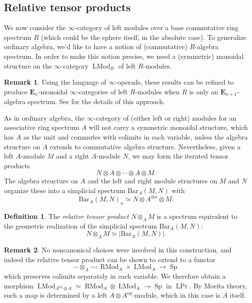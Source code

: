 \documentclass{article}
\theoremstyle{definition}
\newtheorem{definition}{Definition}[subsection]
\newtheorem{remark}{Remark}[subsection]
\newcommand{\EE}{\mathbf{E}}
\newcommand{\too}{\longrightarrow}
\newcommand{\op}{\mathrm{op}}
\DeclareMathOperator{\LMod}{LMod}
\DeclareMathOperator{\RMod}{RMod}
\DeclareMathOperator{\Prl}{LPr}
\DeclareMathOperator{\Sp}{Sp}
\begin{document}
\subsection{Relative tensor products}\label{sec:rtp}


We now consider the $\infty$-category of left modules over a base commutative ring spectrum $R$ (which could be the sphere itself, in the absolute case).
To generalize ordinary algebra, we'd like to have a notion of (commutative) $R$-algebra spectrum.
In order to make this notion precise, we need a (symmetric) monoidal structure on the $\infty$-category $\LMod_R$ of left $R$-modules.
\begin{remark}
Using the language of $\infty$-operads, these results can be refined to produce $\EE_n$-monoidal $\infty$-categories of left $R$-modules when $R$ is only an $\EE_{n+1}$-algebra spectrum.
See \cite{HA} for the details of this approach.
\end{remark}

As in ordinary algebra, the $\infty$-category of (either left or right) modules for an associative ring spectrum $A$ will not carry a symmetric monoidal structure, which has $A$ as the unit and commutes with colimits in each variable, unless the algebra structure on $A$ extends to commutative algebra structure.
Nevertheless, given a left $A$-module $M$ and a right $A$-module $N$, we may form the iterated tensor products
\[
N\otimes A\otimes\cdots\otimes A\otimes M.
\]
The algebra structure on $A$ and the left and right module structures on $M$ and $N$ organize these into a simplicial spectrum $\mathrm{Bar}_A(M,N)$ with
\[
\mathrm{Bar}_A(M,N)_n\simeq N\otimes A^{\otimes n}\otimes M.
\]
\begin{definition}
The {\em relative tensor product} $N\otimes_A M$ is a spectrum equivalent to the geometric realization of the simplicial spectrum $\mathrm{Bar}_A(M,N)$:
\[
N\otimes_A M\simeq |\mathrm{Bar}_A(M,N)|.
\]
\end{definition}
\begin{remark}
No noncanonical choices were involved in this construction, and indeed the relative tensor product can be shown to extend to a functor
\[
-\otimes_A -\colon\RMod_A\times\LMod_A\too\Sp
\]
which preserves colimits separately in each variable.
We therefore obtain a morphism $\LMod_{A^{\op}\otimes A}\simeq\RMod_A\otimes\LMod_A\to\Sp$ in $\Prl$.
By Morita theory, such a map is determined by a left $A\otimes A^{\op}$-module, which in this case is $A$ itself.
\end{remark}
\end{document}
